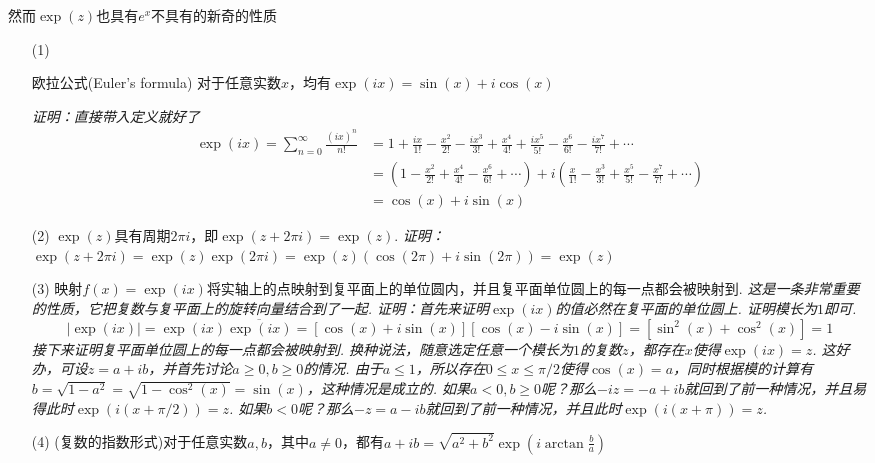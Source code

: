 然而\(\exp(z)\)也具有\(e^x\)不具有的新奇的性质
\begin{itemize}
    \item [(1)] \begin{theorem}{欧拉公式(Euler's formula)}
        对于任意实数\(x\)，均有\(\exp(ix) = \sin(x)+i\cos(x)\)
    \end{theorem}
    \textit{
        证明：直接带入定义就好了
    }
    \begin{align*}
        \exp(ix) = \sum_{n=0}^{\infty} \frac{(ix)^n}{n!} &= 1+\frac{ix}{1!}-\frac{x^2}{2!}-\frac{ix^3}{3!}+\frac{x^4}{4!}+\frac{ix^5}{5!}-\frac{x^6}{6!}-\frac{ix^7}{7!}+\cdots \\
        &= \left(1-\frac{x^2}{2!}+\frac{x^4}{4!}-\frac{x^6}{6!}+\cdots\right)+i\left(\frac{x}{1!}-\frac{x^3}{3!}+\frac{x^5}{5!}-\frac{x^7}{7!}+\cdots\right) \\
        &= \cos(x)+i\sin(x)
    \end{align*}
    \item [(2)] \(\exp(z)\)具有周期\(2\pi i\)，即\(\exp(z+2\pi i) = \exp(z)\).
    \newline
    \textit{
        证明：\(\exp(z+2\pi i) = \exp(z)\exp(2\pi i) = \exp(z)(\cos(2\pi)+i\sin(2\pi)) = \exp(z)\)
    }
    \item [(3)] 映射\(f(x) = \exp(ix)\)将实轴上的点映射到复平面上的单位圆内，并且复平面单位圆上的每一点都会被映射到.
    \newline
    \textit{
        这是一条非常重要的性质，它把复数与复平面上的旋转向量结合到了一起.
        \newline
        证明：首先来证明\(\exp(ix)\)的值必然在复平面的单位圆上. 证明模长为\(1\)即可.
        \[|\exp(ix)| = \exp(ix)\overline{\exp(ix)} = [\cos(x)+i\sin(x)][\cos(x)-i\sin(x)] = \left[\sin^2(x)+\cos^2(x)\right] = 1\]
        接下来证明复平面单位圆上的每一点都会被映射到. 换种说法，随意选定任意一个模长为\(1\)的复数\(z\)，都存在\(x\)使得\(\exp(ix)=z\). 这好办，可设\(z=a+ib\)，并首先讨论\(a \geq 0, b \geq 0\)的情况. 由于\(a\leq 1\)，所以存在\(0\leq x \leq \pi/2\)使得\(\cos(x)=a\)，同时根据模的计算有\(b=\sqrt{1-a^2}=\sqrt{1-\cos^2(x)}=\sin(x)\)，这种情况是成立的. 如果\(a<0, b \geq 0\)呢？那么\(-iz=-a+ib\)就回到了前一种情况，并且易得此时\(\exp(i(x+\pi/2))=z\). 如果\(b<0\)呢？那么\(-z=a-ib\)就回到了前一种情况，并且此时\(\exp(i(x+\pi))=z\).
    }
    \item [(4)] (复数的指数形式)对于任意实数\(a,b\)，其中\(a\neq 0\)，都有\(\displaystyle{a+ib = \sqrt{a^2+b^2}\exp\left(i\arctan\frac{b}{a}\right)}\)
    \newline

\end{itemize}
